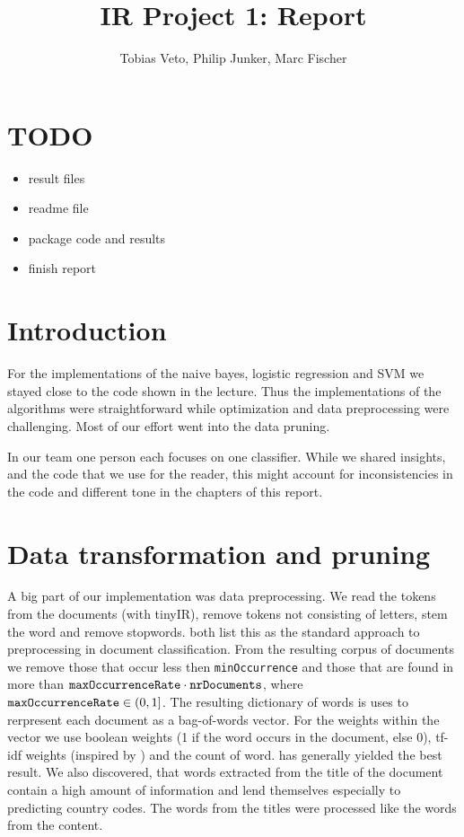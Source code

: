 \documentclass{article}
\title{IR Project 1: Report}
\author{Tobias Veto, Philip Junker, Marc Fischer}
\begin{document}
\section*{TODO}
\begin{itemize}
	\item result files
	\item readme file
	\item package code and results
	\item finish report
\end{itemize}

 
\section*{Introduction}
For the implementations of the naive bayes, logistic regression and SVM we stayed close to the code shown in the lecture. Thus the implementations of the algorithms were straightforward while optimization and data preprocessing were challenging. Most of our effort went into the data pruning.

In our team one person each focuses on one classifier. While we shared insights, and the code that we use for the reader, this might account for inconsistencies in the code and different tone in the chapters of this report.


\section*{Data transformation and pruning}
A big part of our implementation was data preprocessing. We read the tokens from the documents (with tinyIR), remove tokens not consisting of letters, stem the word and remove stopwords. \cite{joachims_text_1998,ozgur_text_2005} both list this as the standard approach to preprocessing in document classification. From the resulting corpus of documents we remove those that occur less then \texttt{minOccurrence} and those that are found in more than $\text{\texttt{maxOccurrenceRate}} \cdot \text{\texttt{nrDocuments}}$, where $\text{\texttt{maxOccurrenceRate}} \in (0, 1]$.
The resulting dictionary of words is uses to rerpresent each document as a bag-of-words vector. For the weights within the vector we use boolean weights (1 if the word occurs in the document, else 0), tf-idf weights (inspired by \cite{ozgur_text_2005}) and the count of word.   has generally yielded the best result.
We also discovered, that words extracted from the title of the document contain a high amount of information and lend themselves especially to predicting country codes. The words from the titles were processed like the words from the content.
\end{document}
